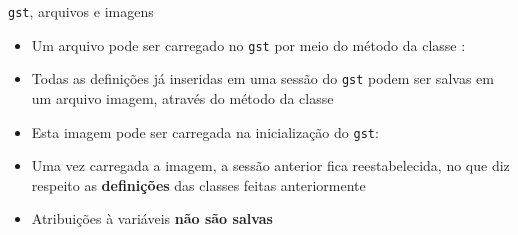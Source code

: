 \begin{frame}[fragile]{{\tt gst}, arquivos e imagens}

    \begin{itemize}
        \item Um arquivo pode ser carregado no \texttt{gst} por meio do método
             da classe :


        \item Todas as definições já inseridas em uma sessão do \texttt{gst} podem ser 
            salvas em um arquivo imagem, através do método  da
            classe 


        \item Esta imagem pode ser carregada na inicialização do \texttt{gst}:


        \item Uma vez carregada a imagem, a sessão anterior fica reestabelecida, no que
            diz respeito as \textbf{definições} das classes feitas anteriormente

        \item Atribuições à variáveis \textbf{não são salvas}
    \end{itemize}

\end{frame}

